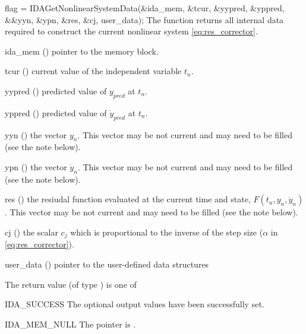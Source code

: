 {
  flag = IDAGetNonlinearSystemData(&ida\_mem, \&tcur, \&yypred, \&yppred, \\
                                   &\&yyn, \&ypn, \&res, \&cj, user\_data);
}
{
  The function  returns all internal
  data required to construct the current nonlinear system
  \eqref{eq:res_corrector}.
}
{
  \begin{args}
  \item[ida\_mem] () pointer to the {\ida} memory block.
  \item[tcur] () current value of the independent variable $t_n$.
  \item[yypred] () predicted value of $y_{pred}$ at $t_n$.
  \item[yppred] () predicted value of $\dot{y}_{pred}$ at $t_n$.
  \item[yyn] () the vector $y_n$. This vector may be not current
    and may need to be filled (see the note below).
  \item[ypn] () the vector $\dot{y}_n$. This vector may be not
    current and may need to be filled (see the note below).
  \item[res] () the resiudal function evaluated at the current
    time and state, $F(t_n, y_n, \dot{y}_n)$. This vector may be not current and
    may need to be filled (see the note below).
  \item[cj] () the scalar $c_j$ which is proportional to the
  inverse of the step size ($\alpha$ in \eqref{eq:res_corrector}).
  \item[user\_data] () pointer to the user-defined data structures
  \end{args}
}
{
  The return value  (of type ) is one of
  \begin{args}
  \item[IDA\_SUCCESS]
    The optional output values have been successfully set.
  \item[IDA\_MEM\_NULL]
    The  pointer is .
  \end{args}
}
